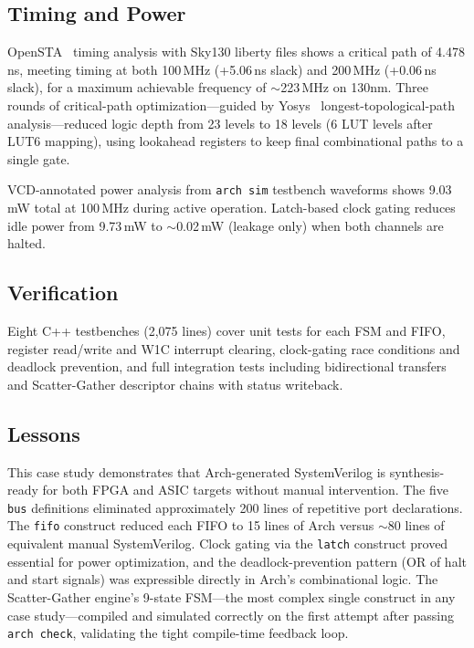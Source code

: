 \documentclass[11pt,twocolumn]{article}
\begin{document}
\subsection{Timing and Power}

OpenSTA~\cite{opensta} timing analysis with Sky130 liberty files shows a critical path of 4.478\,ns, meeting timing at both 100\,MHz (+5.06\,ns slack) and 200\,MHz (+0.06\,ns slack), for a maximum achievable frequency of ${\sim}$223\,MHz on 130nm. Three rounds of critical-path optimization---guided by Yosys~\cite{yosys} longest-topological-path analysis---reduced logic depth from 23 levels to 18 levels (6 LUT levels after LUT6 mapping), using lookahead registers to keep final combinational paths to a single gate.

VCD-annotated power analysis from \texttt{arch sim} testbench waveforms shows 9.03\,mW total at 100\,MHz during active operation. Latch-based clock gating reduces idle power from 9.73\,mW to ${\sim}$0.02\,mW (leakage only) when both channels are halted.

\subsection{Verification}

Eight C++ testbenches (2,075 lines) cover unit tests for each FSM and FIFO, register read/write and W1C interrupt clearing, clock-gating race conditions and deadlock prevention, and full integration tests including bidirectional transfers and Scatter-Gather descriptor chains with status writeback.

\subsection{Lessons}

This case study demonstrates that Arch-generated SystemVerilog is synthesis-ready for both FPGA and ASIC targets without manual intervention. The five \texttt{bus} definitions eliminated approximately 200 lines of repetitive port declarations. The \texttt{fifo} construct reduced each FIFO to 15 lines of Arch versus ${\sim}$80 lines of equivalent manual SystemVerilog. Clock gating via the \texttt{latch} construct proved essential for power optimization, and the deadlock-prevention pattern (OR of halt and start signals) was expressible directly in Arch's combinational logic. The Scatter-Gather engine's 9-state FSM---the most complex single construct in any case study---compiled and simulated correctly on the first attempt after passing \texttt{arch check}, validating the tight compile-time feedback loop.
\end{document}
